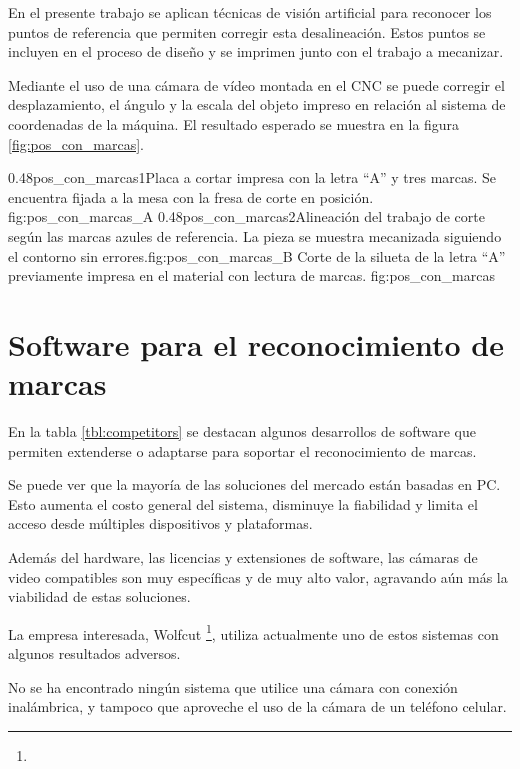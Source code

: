          En el presente trabajo se aplican técnicas de visión artificial para reconocer los puntos de referencia que permiten corregir esta desalineación.
         Estos puntos se incluyen en el proceso de diseño y se imprimen junto con el trabajo a mecanizar.\par
         Mediante el uso de una cámara de vídeo montada en el CNC se puede corregir el desplazamiento, el ángulo y la escala del objeto impreso en relación al sistema de coordenadas de la máquina.
         El resultado esperado se muestra en la figura \ref{fig:pos_con_marcas}.

\subfigab
         {0.48}{pos_con_marcas1}{Placa a cortar impresa con la letra ``A'' y tres marcas. Se encuentra fijada a la mesa con la fresa de corte en posición.\\ \vphantom{10}}{fig:pos_con_marcas_A}
         {0.48}{pos_con_marcas2}{Alineación del trabajo de corte según las marcas azules de referencia. La pieza se muestra mecanizada siguiendo el contorno sin errores.}{fig:pos_con_marcas_B}
         {Corte de la silueta de la letra ``A'' previamente impresa en el material con lectura de marcas. }
         {fig:pos_con_marcas}


\section{Software para el reconocimiento de marcas}
   En la tabla \ref{tbl:competitors} se destacan algunos desarrollos de software que permiten extenderse o adaptarse para soportar el reconocimiento de marcas.\par
   Se puede ver que la mayoría de las soluciones del mercado están basadas en PC. Esto aumenta el costo general del sistema, disminuye la fiabilidad y limita el acceso desde múltiples dispositivos y plataformas.\par

   Además del hardware, las licencias y extensiones de software, las cámaras de video compatibles son muy específicas y de muy alto valor, agravando aún más la viabilidad de estas soluciones.\par

   La empresa interesada, Wolfcut \footnote{\wolfcutlink}, utiliza actualmente uno de estos sistemas con algunos resultados adversos.\par

   No se ha encontrado ningún sistema que utilice una cámara con conexión inalámbrica, y tampoco que aproveche el uso de la cámara de un teléfono celular.\par

